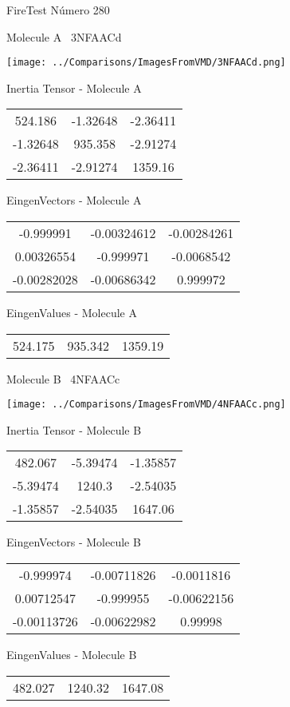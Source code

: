 \vtab[-3cm]
\begin{center}
{\large FireTest \tab Número 280}
\end{center}
\begin{multicols}{2}
\begin{center}

Molecule A \
3NFAACd

\texttt{[image: ../Comparisons/ImagesFromVMD/3NFAACd.png]}

Inertia Tensor - Molecule A \\
\begin{tabular}{|c c c|}
524.186	 & 	-1.32648	 & 	-2.36411	 \\
-1.32648	 & 	935.358	 & 	-2.91274	 \\
-2.36411	 & 	-2.91274	 & 	1359.16
\end{tabular}

\vtab
 EingenVectors - Molecule A     \\
\begin{tabular}{|c c c|}
-0.999991	 & 	-0.00324612	 & 	-0.00284261	 \\
0.00326554	 & 	-0.999971	 & 	-0.0068542	 \\
-0.00282028	 & 	-0.00686342	 & 	0.999972
\end{tabular}

\vtab
 EingenValues - Molecule A     \\
\begin{tabular}{|c c c|}
524.175	 & 	935.342	 & 	1359.19	 \\
\end{tabular}
\columnbreak

Molecule B \
4NFAACc

\texttt{[image: ../Comparisons/ImagesFromVMD/4NFAACc.png]}

Inertia Tensor - Molecule B \\
\begin{tabular}{|c c c|}
482.067	 & 	-5.39474	 & 	-1.35857	 \\
-5.39474	 & 	1240.3	 & 	-2.54035	 \\
-1.35857	 & 	-2.54035	 & 	1647.06
\end{tabular}

\vtab
 EingenVectors - Molecule B     \\
\begin{tabular}{|c c c|}
-0.999974	 & 	-0.00711826	 & 	-0.0011816	 \\
0.00712547	 & 	-0.999955	 & 	-0.00622156	 \\
-0.00113726	 & 	-0.00622982	 & 	0.99998
\end{tabular}

\vtab
 EingenValues - Molecule B     \\
\begin{tabular}{|c c c|}
482.027	 & 	1240.32	 & 	1647.08	 \\
\end{tabular}

\end{center}
\end{multicols}

